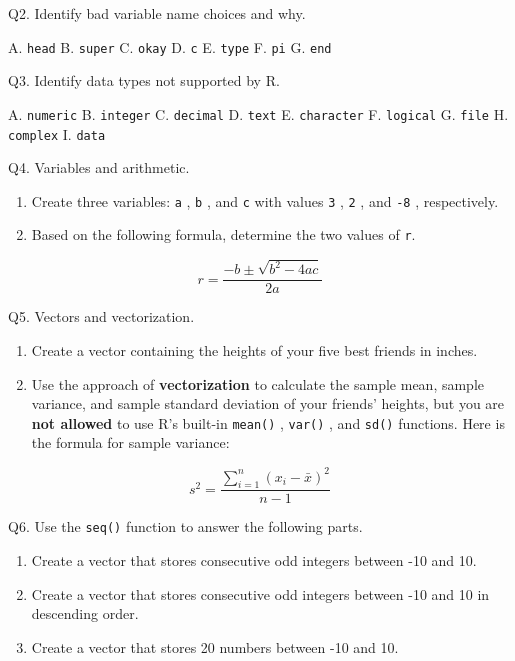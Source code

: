 \documentclass[
  letterpaper,
  DIV=11,
  numbers=noendperiod]{scrreprt}
\begin{document}
Q2. Identify bad variable name choices and why.

A. \texttt{head} B. \texttt{super} C. \texttt{okay} D. \texttt{c} E.
\texttt{type} F. \texttt{pi} G. \texttt{end}

Q3. Identify data types not supported by R.

A. \texttt{numeric} B. \texttt{integer} C. \texttt{decimal} D.
\texttt{text} E. \texttt{character} F. \texttt{logical} G. \texttt{file}
H. \texttt{complex} I. \texttt{data}

Q4. Variables and arithmetic.

\begin{enumerate}
\def\labelenumi{\alph{enumi})}
\item
  Create three variables: \texttt{a} , \texttt{b} , and \texttt{c} with
  values \texttt{3} , \texttt{2} , and \texttt{-8} , respectively.
\item
  Based on the following formula, determine the two values of
  \texttt{r}.
\end{enumerate}

\[r = \frac{-b \pm \sqrt{b^2 - 4ac}}{2a}\]

Q5. Vectors and vectorization.

\begin{enumerate}
\def\labelenumi{\alph{enumi})}
\item
  Create a vector containing the heights of your five best friends in
  inches.
\item
  Use the approach of \textbf{vectorization} to calculate the sample
  mean, sample variance, and sample standard deviation of your friends'
  heights, but you are \textbf{not allowed} to use R's built-in
  \texttt{mean()} , \texttt{var()} , and \texttt{sd()} functions. Here
  is the formula for sample variance:
\end{enumerate}

\[s^2 = \frac{\sum_{i=1}^{n} (x_i - \bar{x})^2}{n - 1}\]

Q6. Use the \texttt{seq()} function to answer the following parts.

\begin{enumerate}
\def\labelenumi{\alph{enumi})}
\item
  Create a vector that stores consecutive odd integers between -10 and
  10.
\item
  Create a vector that stores consecutive odd integers between -10 and
  10 in descending order.
\item
  Create a vector that stores 20 numbers between -10 and 10.
\end{enumerate}
\end{document}
